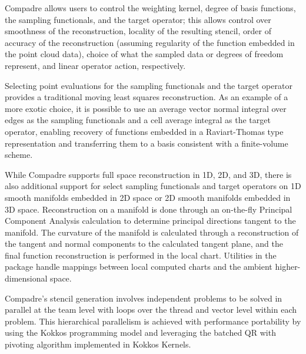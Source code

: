 Compadre allows users to control the weighting kernel, degree of basis functions, the sampling functionals, and the target operator; this allows control over smoothness of the reconstruction, locality of the resulting stencil, order of accuracy of the reconstruction (assuming regularity of the function embedded in the point cloud data), choice of what the sampled data or degrees of freedom represent, and linear operator action, respectively.

Selecting point evaluations for the sampling functionals and the target operator provides a traditional moving least squares reconstruction. As an example of a more exotic choice, it is possible to use an average vector normal integral over edges as the sampling functionals and a cell average integral as the target operator, enabling recovery of functions embedded in a Raviart-Thomas type representation and transferring them to a basis consistent with a finite-volume scheme.

While Compadre supports full space reconstruction in 1D, 2D, and 3D, there is also additional support for select sampling functionals and target operators on 1D smooth manifolds embedded in 2D space or 2D smooth manifolds embedded in 3D space. Reconstruction on a manifold is done through an on-the-fly Principal Component Analysis calculation to determine principal directions tangent to the manifold. The curvature of the manifold is calculated through a reconstruction of the tangent and normal components to the calculated tangent plane, and the final function reconstruction is performed in the local chart. Utilities in the package handle mappings between local computed charts and the ambient higher-dimensional space.

Compadre's stencil generation involves independent problems to be solved in parallel at the team level with loops over the thread and vector level within each problem. This hierarchical parallelism is achieved with performance portability by using the Kokkos programming model and leveraging the batched QR with pivoting algorithm implemented in Kokkos Kernels.
